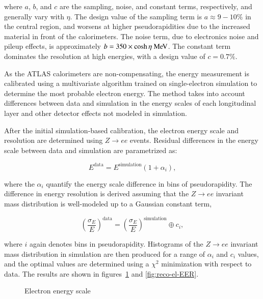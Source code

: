 where $a$, $b$, and $c$ are the sampling, noise, and constant terms, respectively, and generally vary with $\eta$. The design value of the sampling term is $a\approx 9-10\%$ in the central region, and worsens at higher pseudorapidities due to the increased material in front of the calorimeters. The noise term, due to electronics noise and pileup effects, is approximately $b = 350 \times \cosh\eta \MeV$. The constant term dominates the resolution at high energies, with a design value of $c=0.7\%$. 

As the ATLAS calorimeters are non-compensating, the energy measurement is calibrated using a multivariate algorithm trained on single-electron simulation to determine the most probable electron energy. The method takes into account differences between data and simulation in the energy scales of each longitudinal layer and other detector effects not modeled in simulation. 

After the initial simulation-based calibration, the electron energy scale and resolution are determined using $Z\rightarrow ee$ events. Residual differences in the energy scale between data and simulation are parametrized as:

\begin{equation}
	E^{\mathrm{data}} = E^{\mathrm{simulation}} (1 + \alpha_i),
\end{equation}

where the $\alpha_i$ quantify the energy scale difference in bins of pseudorapidity. The difference in energy resolution is derived assuming that the $Z\rightarrow ee$ invariant mass distribution is well-modeled up to a Gaussian constant term, 

\begin{equation}
	\left(\frac{\sigma_E}{E}\right)^{\mathrm{data}} = \left(\frac{\sigma_E}{E}\right)^{\mathrm{simulation}} \oplus c_i,
\end{equation}

where $i$ again denotes bins in pseudorapidity. Histograms of the $Z\rightarrow ee$ invariant mass distribution in simulation are then produced for a range of $\alpha_i$ and $c_i$ values, and the optimal values are determined using a $\chi^2$ minimization with respect to data. The results are shown in figures~\ref{fig:reco-el-EES} and \ref{fig:reco-el-EER}. 

\begin{figure}[htbp]
	\centering

	\caption{Electron energy scale}
	\label{fig:reco-el-EES}
\end{figure}

